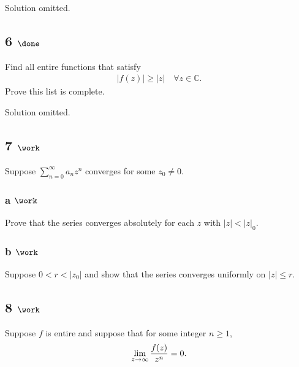 Solution omitted.

\hypertarget{done-5}{%
\subsection{\texorpdfstring{6
\(\done\)}{6 \textbackslash done}}\label{done-5}}

Find all entire functions that satisfy
\begin{align*}
{\left\lvert {f(z)} \right\rvert} \geq {\left\lvert {z} \right\rvert} \quad \forall z\in {\mathbb{C}}
.\end{align*}
Prove this list is complete.

Solution omitted.

\hypertarget{work-26}{%
\subsection{\texorpdfstring{7
\(\work\)}{7 \textbackslash work}}\label{work-26}}

Suppose \(\sum_{n=0}^\infty a_n z^n\) converges for some \(z_0 \neq 0\).

\hypertarget{a-work-4}{%
\subsubsection{\texorpdfstring{a
\(\work\)}{a \textbackslash work}}\label{a-work-4}}

Prove that the series converges absolutely for each \(z\) with
\({\left\lvert {z} \right\rvert} < {\left\lvert {z} \right\rvert}_0\).

\hypertarget{b-work-6}{%
\subsubsection{\texorpdfstring{b
\(\work\)}{b \textbackslash work}}\label{b-work-6}}

Suppose \(0 < r < {\left\lvert {z_0} \right\rvert}\) and show that the
series converges uniformly on \({\left\lvert {z} \right\rvert} \leq r\).

\hypertarget{work-27}{%
\subsection{\texorpdfstring{8
\(\work\)}{8 \textbackslash work}}\label{work-27}}

Suppose \(f\) is entire and suppose that for some integer \(n\geq 1\),
\begin{align*}
\lim_{z\to \infty} {f(z) \over z^n} = 0
.\end{align*}

